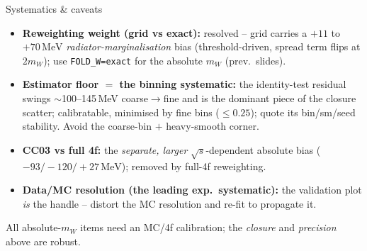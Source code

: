 \documentclass[aspectratio=169,10pt]{beamer}
\newcommand{\mw}{m_W}
\newcommand{\MeV}{\,\mathrm{MeV}}
\newcommand{\good}[1]{\textcolor{good}{#1}}
\newcommand{\warn}[1]{\textcolor{warn}{#1}}
\begin{document}
\begin{frame}{Systematics \& caveats}
\begin{itemize}
  \item \textbf{Reweighting weight (grid vs exact):} \good{resolved} -- grid carries a $+11$ to $+70\MeV$
        \emph{radiator-marginalisation} bias (threshold-driven, spread term flips at $2\mw$); use
        \texttt{FOLD\_W=exact} for the absolute $\mw$ (prev.\ slides).
  \item \textbf{Estimator floor $=$ the binning systematic:} the identity-test residual swings $\sim$100--145\,MeV
        coarse$\to$fine and is the dominant piece of the closure scatter; \good{calibratable}, minimised by fine bins
        ($\le0.25$); quote its bin/sm/seed stability. \warn{Avoid} the coarse-bin $+$ heavy-smooth corner.
  \item \textbf{CC03 vs full 4f:} the \emph{separate, larger} $\sqrt{s}$-dependent absolute bias
        ($-93/-120/+27\MeV$); removed by full-4f reweighting.
  \item \textbf{Data/MC resolution (the leading exp.\ systematic):} the validation plot \emph{is} the handle --
        distort the MC resolution and re-fit to propagate it.
\end{itemize}
\vfill
\footnotesize All absolute-$\mw$ items need an MC/4f calibration; the \emph{closure} and \emph{precision} above are robust.
\end{frame}
\end{document}
